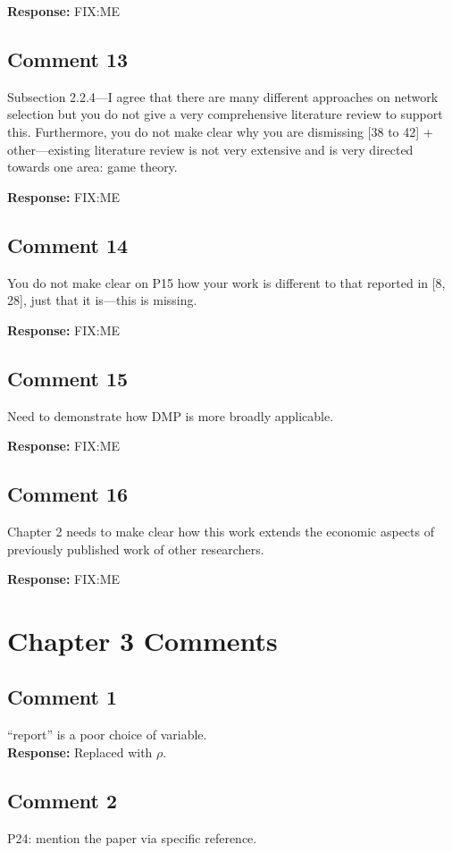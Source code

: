\documentclass[10pt,a4paper,notitlepage]{article}
\numberwithin{equation}{section}
\begin{document}
\textbf{Response:}
FIX:ME

\subsection{Comment 13}
Subsection 2.2.4---I agree that there are many different approaches on network selection but you do not give a very comprehensive literature review to support this. Furthermore, you do not make clear why you are dismissing [38 to 42] + other---existing literature review is not very extensive and is very directed towards one area: game theory.

\textbf{Response:}
FIX:ME

\subsection{Comment 14}
You do not make clear on P15 how your work is different to that reported in [8, 28], just that it is---this is missing.

\textbf{Response:}
FIX:ME

\subsection{Comment 15}
Need to demonstrate how DMP is more broadly applicable.

\textbf{Response:}
FIX:ME

\subsection{Comment 16}
Chapter 2 needs to make clear how this work extends the economic aspects of previously published work of other researchers.

\textbf{Response:}
FIX:ME

\clearpage

\section{Chapter 3 Comments}
\subsection{Comment 1}
``report'' is a poor choice of variable.\\[-2ex]

\textbf{Response:}
Replaced with $\rho$.

\subsection{Comment 2}
P24: mention the paper via specific reference.\\[-2ex]
\end{document}
